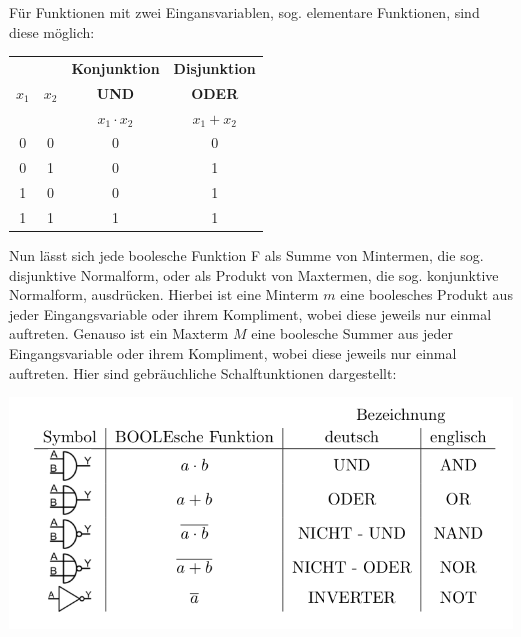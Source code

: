 \documentclass[10pt]{article}
\newenvironment{Figure}
  {\par\medskip\noindent\minipage{\linewidth}}
  {\endminipage\par\medskip}
\begin{document}
\begin{multicols}{2}
	Für Funktionen mit zwei Eingansvariablen, sog. elementare Funktionen, sind diese möglich:
	\begin{center}
		\begin{tabular}{|c|c|c|c|}
			\hline
			      &       & \textbf{Konjunktion} & \textbf{Disjunktion} \\
			$x_1$ & $x_2$ & \textbf{UND}         & \textbf{ODER}        \\
			      &       & $x_1 \cdot x_2$      & $x_1 + x_2$          \\
			\hline
			0     & 0     & 0                    & 0                    \\
			0     & 1     & 0                    & 1                    \\
			1     & 0     & 0                    & 1                    \\
			1     & 1     & 1                    & 1                    \\
			\hline
		\end{tabular}
	\end{center}

	Nun lässt sich jede boolesche Funktion F als Summe von Mintermen, die sog. disjunktive Normalform, oder als Produkt von Maxtermen, die sog. konjunktive Normalform, ausdrücken. Hierbei ist eine Minterm $m$ eine boolesches Produkt aus jeder Eingangsvariable oder ihrem Kompliment, wobei diese jeweils nur einmal auftreten. Genauso ist ein Maxterm $M$ eine boolesche Summer aus jeder Eingangsvariable oder ihrem Kompliment, wobei diese jeweils nur einmal auftreten.
	Hier sind gebräuchliche Schalftunktionen dargestellt:
	\begin{Figure}
		\centering
		\includegraphics[width=1\textwidth]{schaltfunktionen.png}
	\end{Figure}

\end{multicols}
\end{document}
